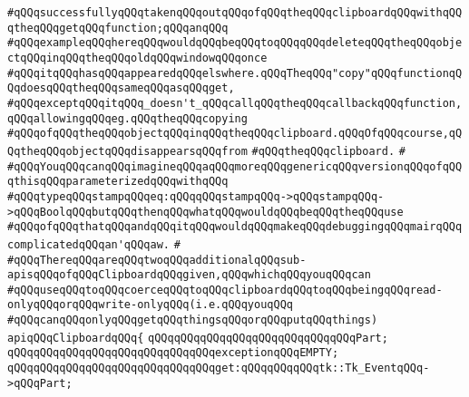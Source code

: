 \verb|#qQQqsuccessfullyqQQqtakenqQQqoutqQQqofqQQqtheqQQqclipboardqQQqwithqQQqtheqQQqgetqQQqfunction;qQQqanqQQq|\newline
\verb|#qQQqexampleqQQqhereqQQqwouldqQQqbeqQQqtoqQQqqQQqdeleteqQQqtheqQQqobjectqQQqinqQQqtheqQQqoldqQQqwindowqQQqonce|\newline
\verb|#qQQqitqQQqhasqQQqappearedqQQqelswhere.qQQqTheqQQq"copy"qQQqfunctionqQQqdoesqQQqtheqQQqsameqQQqasqQQqget,|\newline
\verb|#qQQqexceptqQQqitqQQq_doesn't_qQQqcallqQQqtheqQQqcallbackqQQqfunction,qQQqallowingqQQqeg.qQQqtheqQQqcopying|\newline
\verb|#qQQqofqQQqtheqQQqobjectqQQqinqQQqtheqQQqclipboard.qQQqOfqQQqcourse,qQQqtheqQQqobjectqQQqdisappearsqQQqfrom|\newline
\verb|#qQQqtheqQQqclipboard.|\newline
\verb|#|\newline
\verb|#qQQqYouqQQqcanqQQqimagineqQQqaqQQqmoreqQQqgenericqQQqversionqQQqofqQQqthisqQQqparameterizedqQQqwithqQQq|\newline
\verb|#qQQqtypeqQQqstampqQQqeq:qQQqqQQqstampqQQq->qQQqstampqQQq->qQQqBoolqQQqbutqQQqthenqQQqwhatqQQqwouldqQQqbeqQQqtheqQQquse|\newline
\verb|#qQQqofqQQqthatqQQqandqQQqitqQQqwouldqQQqmakeqQQqdebuggingqQQqmairqQQqcomplicatedqQQqan'qQQqaw.|\newline
\verb|#|\newline
\verb|#qQQqThereqQQqareqQQqtwoqQQqadditionalqQQqsub-apisqQQqofqQQqClipboardqQQqgiven,qQQqwhichqQQqyouqQQqcan|\newline
\verb|#qQQquseqQQqtoqQQqcoerceqQQqtoqQQqclipboardqQQqtoqQQqbeingqQQqread-onlyqQQqorqQQqwrite-onlyqQQq(i.e.qQQqyouqQQq|\newline
\verb|#qQQqcanqQQqonlyqQQqgetqQQqthingsqQQqorqQQqputqQQqthings)|\newline
\newline
\newline
\newline
\verb|apiqQQqClipboardqQQq{|\newline
\newline
\verb|qQQqqQQqqQQqqQQqqQQqqQQqqQQqqQQqPart;|\newline
\newline
\verb|qQQqqQQqqQQqqQQqqQQqqQQqqQQqqQQqexceptionqQQqEMPTY;|\newline
\newline
\verb|qQQqqQQqqQQqqQQqqQQqqQQqqQQqqQQqget:qQQqqQQqqQQqtk::Tk_EventqQQq->qQQqPart;|\newline
